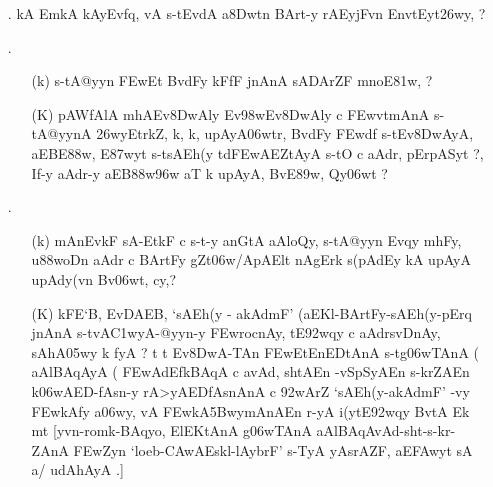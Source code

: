 \begin{itemize}
  \item[{\dn\dnnum \rn{1}}.] {\dn kA EmkA kAy\0Evf\?q, vA s\2-tEvdA a\38Dwtn\? BArt-y rAEyjFvn\? Env\0t\0Eyt\326wy, {\rs ?\re}}  
  
  \item[{\dn\dnnum \rn{2}}.] \begin{itemize} 
                        \item[({\dn k})] {\dn s\2-tA@yyn\2 \3FEwEt BvdFy\? kFfF jnAnA\2 sADArZF mnoE\381w, {\rs ?\re}}
                        
                        \item[({\dn K})] {\dn pAWfAlA mhAEv\38DwAly\? Ev\398wEv\38DwAly\? c \3FEwvt\0mAnA s\2-tA@yynA \326wyEtr\?k\?Z{\rs ,\re} k\4, k\4, upAyA\306wtr\4, BvdFy\? \3FEwd\?f\? s\2-tEv\38DwAyA, aEBE\388w, E\387wyt\?{\rs ,\re} s\2-tsAEh(y\? td\3FEwAEZtAyA\2 s\2-tO c aAdr, pErpASyt\? {\rs ?,\re} If-y aAdr-y aEB\388w\?\396w aT\?{\qvb} k\? upAyA, BvE\389w, Qy\306wt\? {\rs ?\re}}
                       \end{itemize}
                       
 \item[{\dn\dnnum \rn{3}}.] \begin{itemize}
                      \item[({\dn k})] {\dn mAnEvkF sA\2-EtkF c s\2-t-y anG\0tA aAloQy{\rs ,\re} s\2-tA@yyn\- Evqy\? mhFy, u\388woDn aAdr\2 c BArtFy gZt\306w/ApAElt\? nAgErk\? s(pAdEy\2 kA upAyA upAd\?y(v\?n Bv\306wt, cy\?,{\rs ?\re}}
                      
                      \item[({\dn K})] {\dn kFE`B, EvDAEB, {\rs `\re}sAEh(y {\rs -\re} akAd\?mF{\rs '\re} {\rs (\re}aEKl{\rs -\re}\break\-BArtFy{\rs -\re}sAEh(y{\rs -\re}pErq jnAnA\2 s\2-tvA\3C1wyA{\rs -\re}\break\-@yyn-y \3FEwrocnAy{\rs ,\re} tE\392wqy\? c aAdrs\2vD\0nAy{\rs ,\re} sAhA\305wy\2 k fyA {\rs ?\re} t\? t\? Ev\38DwA-TAn\?  \3FEwEtEnEDtAnA\2 s\2-tg\5\306wTAnA {\rs (\re}\dn\dnnum {} aAlBAqAyA\2 {\rs (\re}\dn\dnnum {} \3FEwAd\?EfkBAqA c avAd\4, shtAEn -vSp\-SyAEn  s\2-krZAEn k\?\306wAED{\rs -\re}\-fAsn-y rA>yAEDfAs\-nAnA\2 c \392wAr\?Z  {\rs `\re}sAEh(y{\rs -\re}akAd\?mF{\rs '\re} -vy\2 \3FEwkAfy\? a\306wy\4, vA \3FEwkA\35BwymAnAEn r-yA\0 i(y\?tE\392wqy\? BvtA\2 Ek\2 mt {\rs [\re}yvn{\rs -\re}romk{\rs -\re}BAqyo, ElEKtAnA\2 g\5\306wTAnA aAlBAqAvAd{\rs -\re}sht{\rs -\re}s\2-kr{\rs -\re}\-ZAnA\2 \3FEwZ\-yn\?{\rs ,\re} {\rs `\re}loeb{\rs -\re}\3CAwAEskl{\rs -\re}lAyb\5rF{\rs '\re} s\2-TyA yA\break srAZF, aE\3FAwyt\?{\rs ,\re} sA a/ udAhAyA\0 .{\rs ]\re}}
                      

\end{itemize}
\end{itemize}
